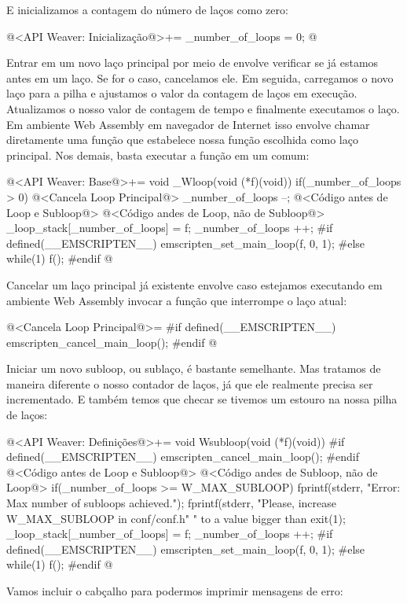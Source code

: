 E inicializamos a contagem do número de laços como zero:

\iniciocodigo
@<API Weaver: Inicialização@>+=
_number_of_loops = 0;
@
\fimcodigo

Entrar em um novo laço principal por meio de 
envolve verificar se já estamos antes em um laço. Se for o caso,
cancelamos ele. Em seguida, carregamos o novo laço para a pilha e
ajustamos o valor da contagem de laços em execução. Atualizamos o
nosso valor de contagem de tempo e finalmente executamos o laço. Em
ambiente Web Assembly em navegador de Internet isso envolve chamar
diretamente uma função que estabelece nossa função escolhida como laço
principal. Nos demais, basta executar a função em
um  comum:

\iniciocodigo
@<API Weaver: Base@>+=
void _Wloop(void (*f)(void)){
  if(_number_of_loops > 0){
    @<Cancela Loop Principal@>
    _number_of_loops --;
  }
  @<Código antes de Loop e Subloop@>
  @<Código andes de Loop, não de Subloop@>
  _loop_stack[_number_of_loops] = f;
  _number_of_loops ++;
#if defined(__EMSCRIPTEN__)
  emscripten_set_main_loop(f, 0, 1);
#else
  while(1)
    f();
#endif
}
@
\fimcodigo

Cancelar um laço principal já existente envolve caso estejamos
executando em ambiente Web Assembly invocar a função que interrompe o
laço atual:

\iniciocodigo
@<Cancela Loop Principal@>=
#if defined(__EMSCRIPTEN__)
emscripten_cancel_main_loop();
#endif
@
\fimcodigo

Iniciar um novo subloop, ou sublaço, é bastante semelhante. Mas
tratamos de maneira diferente o nosso contador de laços, já que ele
realmente precisa ser incrementado. E também temos que checar se
tivemos um estouro na nossa pilha de laços:

\iniciocodigo
@<API Weaver: Definições@>+=
void Wsubloop(void (*f)(void)){
#if defined(__EMSCRIPTEN__)
    emscripten_cancel_main_loop();
#endif
  @<Código antes de Loop e Subloop@>
  @<Código andes de Subloop, não de Loop@>
  if(_number_of_loops >= W_MAX_SUBLOOP){
    fprintf(stderr, "Error: Max number of subloops achieved.\n");
    fprintf(stderr, "Please, increase W_MAX_SUBLOOP in conf/conf.h"
            " to a value bigger than %
    exit(1);
  }
  _loop_stack[_number_of_loops] = f;
  _number_of_loops ++;
#if defined(__EMSCRIPTEN__)
  emscripten_set_main_loop(f, 0, 1);
#else
  while(1)
    f();
#endif
}
@
\fimcodigo

Vamos incluir o cabçalho para podermos imprimir mensagens de erro:

